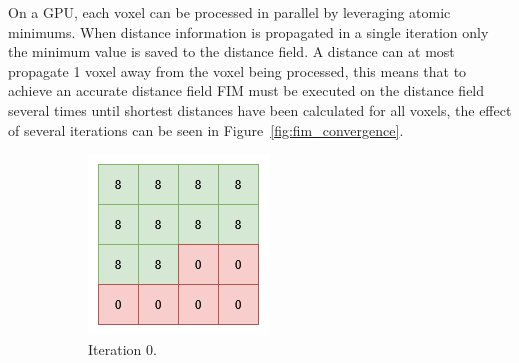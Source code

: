 On a GPU, each voxel can be processed in parallel by leveraging atomic minimums. When distance information is propagated
in a single iteration only the minimum value is saved to the distance field. A distance can at most propagate 1 voxel
away from the voxel being processed, this means that to achieve an accurate distance field FIM must be executed on the
distance field several times until shortest distances have been calculated for all voxels, the effect of several
iterations can be seen in Figure~\ref{fig:fim_convergence}.

\begin{figure}[htbp]
    \centering
    \begin{subfigure}[t]{0.24\textwidth}
        \centering
        \includegraphics[width=\textwidth]{figures/voxel_grid_fmm_init.drawio.png}
        \caption{Iteration 0.}
    \end{subfigure}
    \hfill
    \begin{subfigure}[t]{0.24\textwidth}
        \centering

\end{subfigure}
\end{figure}
